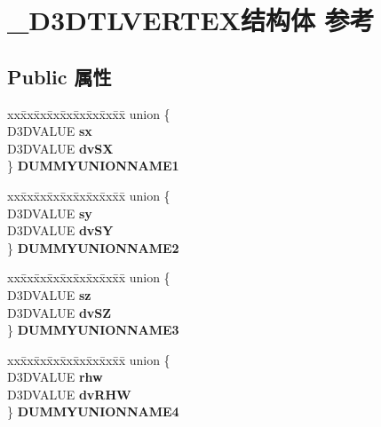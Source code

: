 \hypertarget{struct___d3_d_t_l_v_e_r_t_e_x}{}\section{\+\_\+\+D3\+D\+T\+L\+V\+E\+R\+T\+E\+X结构体 参考}
\label{struct___d3_d_t_l_v_e_r_t_e_x}
\subsection*{Public 属性}
\begin{DoxyCompactItemize}
\item 
\mbox{\label{struct___d3_d_t_l_v_e_r_t_e_x_a8135d68d9e3f4686f0535f92d8b3ca0e}} 
\begin{tabbing}
xx\=xx\=xx\=xx\=xx\=xx\=xx\=xx\=xx\=\kill
union \{\\
\>D3DVALUE {\bfseries sx}\\
\>D3DVALUE {\bfseries dvSX}\\
\} {\bfseries DUMMYUNIONNAME1}\\

\end{tabbing}\item 
\mbox{\label{struct___d3_d_t_l_v_e_r_t_e_x_a2dc923c9c201cafb32505b967b585991}} 
\begin{tabbing}
xx\=xx\=xx\=xx\=xx\=xx\=xx\=xx\=xx\=\kill
union \{\\
\>D3DVALUE {\bfseries sy}\\
\>D3DVALUE {\bfseries dvSY}\\
\} {\bfseries DUMMYUNIONNAME2}\\

\end{tabbing}\item 
\mbox{\label{struct___d3_d_t_l_v_e_r_t_e_x_a5942bc25998b308efe7100550028a433}} 
\begin{tabbing}
xx\=xx\=xx\=xx\=xx\=xx\=xx\=xx\=xx\=\kill
union \{\\
\>D3DVALUE {\bfseries sz}\\
\>D3DVALUE {\bfseries dvSZ}\\
\} {\bfseries DUMMYUNIONNAME3}\\

\end{tabbing}\item 
\mbox{\label{struct___d3_d_t_l_v_e_r_t_e_x_ac423d5268ee932b3d34c9310a2ffb587}} 
\begin{tabbing}
xx\=xx\=xx\=xx\=xx\=xx\=xx\=xx\=xx\=\kill
union \{\\
\>D3DVALUE {\bfseries rhw}\\
\>D3DVALUE {\bfseries dvRHW}\\
\} {\bfseries DUMMYUNIONNAME4}\\


\end{tabbing}
\end{DoxyCompactItemize}
